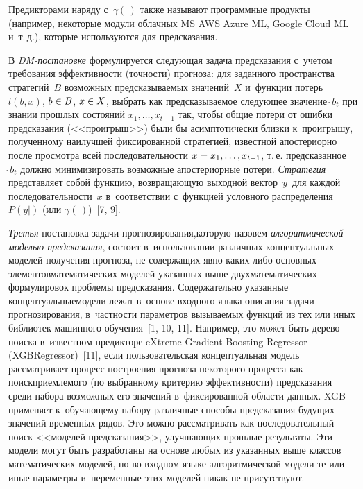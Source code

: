 \begin{multicols}{2}
  Предикторами наряду с~$\gamma(\,)$ также называют программные 
продукты (например, некоторые модули облачных MS AWS Azure ML, 
Google Cloud ML и~т.\,д.), которые используются для предсказания.
  
  В \textit{DM-постановке} формулируется сле\-ду\-ющая задача пред\-ска\-за\-ния 
с~учетом требования эф\-фек\-тив\-ности (точ\-ности) прогноза: для заданного 
\mbox{про\-стран\-ст\-ва} стратегий~$B$ возможных пред\-ска\-зы\-ва\-емых значений~$X$ 
и~функции потерь $l(b, x)$, $b \hm\in B$, $x \hm\in X$, выбрать как 
пред\-ска\-зы\-ва\-емое сле\-ду\-ющее значение $\hat{\,}b_t$ при знании прош\-лых 
со\-сто\-яний $x_1, \ldots, x_{t-1}$ так, чтобы общие потери от ошибки 
пред\-ска\-за\-ния (<<проигрыш>>) были бы асимптотически близ\-ки к~проигрышу, полученному наилучшей фиксированной стратегией, известной 
апостериорно после про\-смот\-ра всей по\-сле\-до\-ва\-тель\-ности $x \hm= x_1, \ldots, 
x_{t-1}$, т.\,е. предсказанное~$\hat{\,}b_t$ долж\-но минимизировать возможные 
апостериорные потери. \textit{Стратегия} пред\-став\-ля\-ет собой функцию, 
воз\-вра\-ща\-ющую выходной вектор~$y$~для каж\-дой по\-сле\-до\-ва\-тель\-ности~$x$ 
в~соответствии с~функцией услов\-но\-го распределения $P(y\vert )$ (или 
$\gamma (\,)$)~[7, 9].
  
  \textit{Третья} постановка задачи прогнозирования,\linebreak которую назовем 
\textit{алгоритмической моделью предсказания}, состоит в~использовании 
различных концептуальных моделей получения прогноза, не \mbox{содержащих} 
явно ка\-ких-ли\-бо основных элементов\linebreak математических моделей указанных 
выше двух\linebreak математических формулировок проб\-ле\-мы предсказания. 
Содержательно указанные концептуальные\linebreak модели лежат в~основе входного 
языка описания задачи прогнозирования, в~част\-ности па\-ра\-мет\-ров 
вызываемых функций из тех или иных биб\-лио\-тек машинного обуче\-ния~[1, 
10, 11]. Например, это может быть дерево поиска в~известном предикторе 
eXtreme Gradient Boosting Regressor (\mbox{XGBRegressor})~[11], если 
пользовательская концептуальная модель рас\-смат\-ри\-ва\-ет процесс по\-строения 
прогноза некоторого процесса как поиск\linebreak приемлемого (по выбранному 
критерию эффективности) предсказания среди набора возможных его 
значений в~фиксированной об\-ласти данных. XGB применяет к~обуча\-юще\-му 
набору различные способы предсказания будущих значений временн$\acute{\mbox{ы}}$х 
рядов. Это можно рас\-смат\-ри\-вать как последовательный поиск <<моделей 
предсказания>>, улуч\-ша\-ющих прошлые результаты. Эти модели могут быть 
разработаны на основе любых из указанных выше классов математических 
моделей, но во входном языке алгоритмической модели те или иные 
параметры и~переменные этих моделей никак не присутствуют.
  

\end{multicols}
